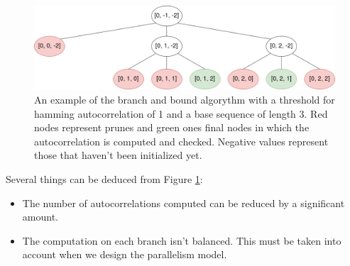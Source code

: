   \begin{figure}[ht!]
    \begin{center}
      \includegraphics[scale=0.4]{Chapters/Implementation/Example_branch_bound.png}
    \end{center}
    \caption{An example of the branch and bound algorythm with a threshold for
    hamming autocorrelation of 1 and a base sequence of length 3. Red nodes
    represent prunes and green ones final nodes in which the
    autocorrelation is computed and checked. Negative values represent those
    that haven't been initialized yet.}
    \label{bb:fig:1}
  \end{figure}

  Several things can be deduced from Figure \ref{bb:fig:1}:
  \begin{itemize}
    \item The number of autocorrelations computed can be reduced by a significant
    amount.
    \item The computation on each branch isn't balanced. This must be taken
    into account when we design the parallelism model.
  \end{itemize}
